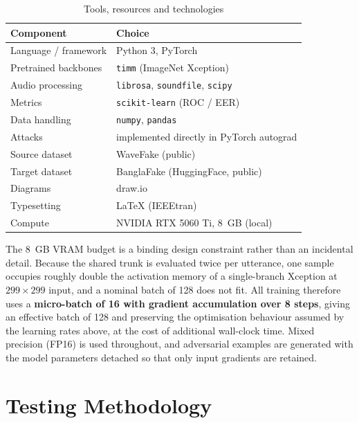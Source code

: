 \documentclass[conference]{IEEEtran}
\begin{document}
\begin{table}[!t]
\caption{Tools, resources and technologies}
\label{tab:tools}
\centering
\renewcommand{\arraystretch}{1.15}
\begin{tabular}{@{}ll@{}}
\toprule
\textbf{Component} & \textbf{Choice} \\
\midrule
Language / framework  & Python 3, PyTorch \\
Pretrained backbones  & \texttt{timm} (ImageNet Xception) \\
Audio processing      & \texttt{librosa}, \texttt{soundfile}, \texttt{scipy} \\
Metrics               & \texttt{scikit-learn} (ROC / EER) \\
Data handling         & \texttt{numpy}, \texttt{pandas} \\
Attacks               & implemented directly in PyTorch autograd \\
Source dataset        & WaveFake (public) \\
Target dataset        & BanglaFake (HuggingFace, public) \\
Diagrams              & draw.io \\
Typesetting           & \LaTeX{} (IEEEtran) \\
Compute               & NVIDIA RTX 5060 Ti, 8~GB (local) \\
\bottomrule
\end{tabular}
\end{table}

The 8~GB VRAM budget is a binding design constraint rather than an incidental
detail. Because the shared trunk is evaluated twice per utterance, one sample
occupies roughly double the activation memory of a single-branch Xception at
$299 \times 299$ input, and a nominal batch of 128 does not fit. All training
therefore uses a \textbf{micro-batch of 16 with gradient accumulation over 8
steps}, giving an effective batch of 128 and preserving the optimisation
behaviour assumed by the learning rates above, at the cost of additional
wall-clock time. Mixed precision (FP16) is used throughout, and adversarial
examples are generated with the model parameters detached so that only input
gradients are retained.

\section{Testing Methodology}
\label{sec:testing}
\end{document}
